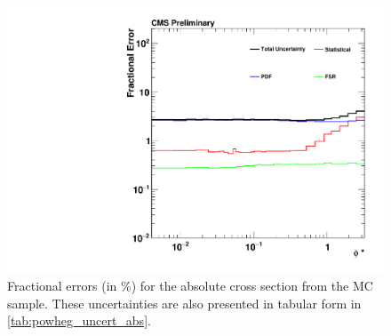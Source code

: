 \begin{figure}[!p]
    \centering
    \includegraphics[width=\textwidth]{figures/powheg_uncertainty_absolute.pdf}
    \caption[
        Fractional errors (in \%) for the absolute cross section from the
        \POWHEG MC sample.
    ]{
        Fractional errors (in \%) for the absolute cross section from the
        \POWHEG MC sample. These uncertainties are also presented in tabular
        form in \cref{tab:powheg_uncert_abs}.
    }
    \label{fig:powheg_uncert_abs}
\end{figure}
